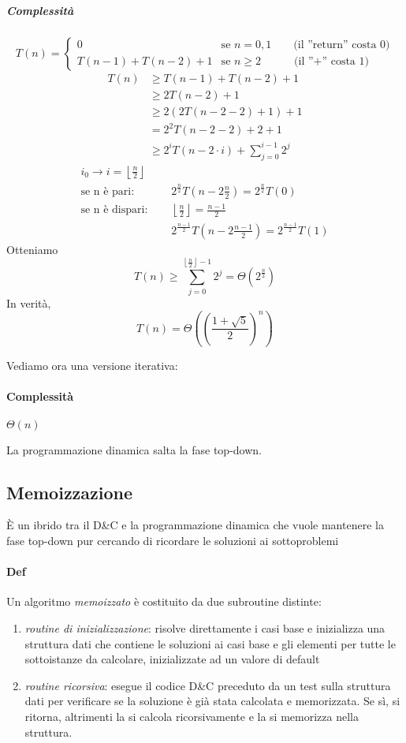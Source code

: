 \subparagraph{Complessità}
\[ T(n) =
\begin{cases}
0 & \text{se } n = 0,1 \qquad \text{(il ''return'' costa 0)} \\
T(n-1) + T(n-2) + 1 & \text{se } n \geq 2 \qquad \quad \text{(il ''+'' costa 1)}
\end{cases}
\]
\begin{align*}
	T(n) & \geq T(n-1) + T(n-2) + 1 \\
	& \geq 2T(n-2) + 1 \\
	& \geq 2(2T(n-2-2)+1) + 1 \\
	& = 2^2 T(n-2-2) + 2 + 1 \\
	& \geq 2^i T(n-2 \cdot i) + \sum_{j=0}^{i-1} 2^j
\end{align*}
\begin{align*}
	i_0 \rightarrow i = \left \lfloor{\frac{n}{2}} \right \rfloor & \\
	\text{se n è pari: } & \quad 2^\frac{n}{2} T(n-2 \frac{n}{2}) = 2^\frac{n}{2} T(0) \\
	\text{se n è dispari: } & \quad \left \lfloor{\frac{n}{2}} \right \rfloor = \frac{n-1}{2} \\
	& \quad 2^\frac{n-1}{2} T(n-2 \frac{n-1}{2}) =  2^\frac{n-1}{2} T(1)
\end{align*}
Otteniamo
$$T(n) \geq \sum_{j=0}^{\left \lfloor{\frac{n}{2}} \right \rfloor -1} 2^j = \Theta(2^\frac{n}{2})$$
In verità,
$$T(n) = \Theta \left(\left(\frac{1+\sqrt{5}}{2}\right)^n \right)$$
\bigskip
\par Vediamo ora una versione iterativa:


\paragraph{Complessità} $\Theta(n)$
\bigskip
\par La programmazione dinamica salta la fase top-down.

\subsection{Memoizzazione}
\`E un ibrido tra il D\&C e la programmazione dinamica che vuole mantenere la fase top-down pur cercando di ricordare le soluzioni ai sottoproblemi

\paragraph{Def} Un algoritmo \emph{memoizzato} è costituito da due subroutine distinte:
\begin{enumerate}[label={\arabic*)}]
	\item \emph{routine di inizializzazione}: risolve direttamente i casi base e inizializza una struttura dati che contiene le soluzioni ai casi base e gli elementi per tutte le sottoistanze da calcolare, inizializzate ad un valore di default
	\item \emph{routine ricorsiva}: esegue il codice D\&C preceduto da un test sulla struttura dati per verificare se la soluzione è già stata calcolata e memorizzata. Se sì, si ritorna, altrimenti la si calcola ricorsivamente e la si memorizza nella struttura.
\end{enumerate}

